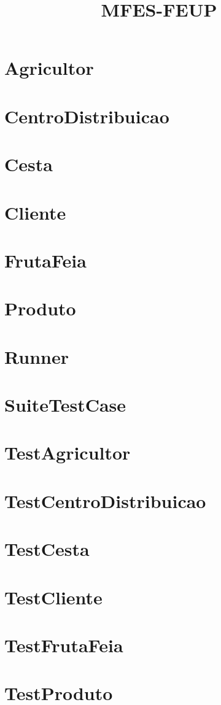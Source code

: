 \documentclass{article}
\begin{document}
\title{MFES-FEUP}
\author{}
\maketitle
\tableofcontents

\section{Agricultor}

\section{CentroDistribuicao}

\section{Cesta}

\section{Cliente}

\section{FrutaFeia}

\section{Produto}

\section{Runner}

\section{SuiteTestCase}

\section{TestAgricultor}

\section{TestCentroDistribuicao}

\section{TestCesta}

\section{TestCliente}

\section{TestFrutaFeia}

\section{TestProduto}

\end{document}
